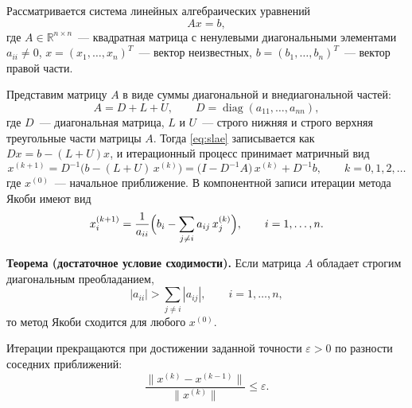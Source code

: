 \documentclass[14pt, a4paper, oneside]{extarticle}
\begin{document}
Рассматривается система линейных алгебраических уравнений
\begin{equation}\label{eq:slae}
A x = b,
\end{equation}
где $A \in \mathbb{R}^{n \times n}$~--- квадратная матрица с ненулевыми
диагональными элементами $a_{ii} \neq 0$,
 $x = (x_1, \dots, x_n)^{T}$~--- вектор неизвестных,
 $b = (b_1, \dots, b_n)^{T}$~--- вектор правой части.

Представим матрицу $A$ в виде суммы диагональной и внедиагональной частей:
\begin{equation}\label{eq:split}
A = D + L + U, \qquad
D = \operatorname{diag}(a_{11}, \dots, a_{nn}),
\end{equation}
где $D$~--- диагональная матрица, $L$ и $U$~--- строго нижняя и строго
верхняя треугольные части матрицы $A$. Тогда \eqref{eq:slae} записывается
как $D x = b - (L + U) x$, и итерационный процесс принимает матричный вид
\begin{equation}\label{eq:jacobi_matrix}
x^{(k+1)} = D^{-1}\bigl(b - (L + U)\, x^{(k)}\bigr)
          = \bigl(I - D^{-1} A\bigr)\, x^{(k)} + D^{-1} b,
\qquad k = 0, 1, 2, \dots
\end{equation}
где $x^{(0)}$~--- начальное приближение. В компонентной записи итерации
метода Якоби имеют вид
\begin{equation}\label{eq:jacobi_comp}
x_i^{(k+1)} = \frac{1}{a_{ii}}
\Bigl( b_i - \sum_{j \ne i} a_{ij}\, x_j^{(k)} \Bigr),
\qquad i = 1, \dots, n.
\end{equation}

\textbf{Теорема (достаточное условие сходимости).} Если матрица $A$ обладает строгим диагональным преобладанием,
\begin{equation}\label{eq:diagdom}
|a_{ii}| > \sum_{j \ne i} |a_{ij}|, \qquad i = 1, \dots, n,
\end{equation}
то метод Якоби сходится для любого $x^{(0)}$. 

Итерации прекращаются при достижении заданной точности $\varepsilon > 0$ по разности
соседних приближений:
\begin{equation}\label{eq:stop}
\frac{\bigl\| x^{(k)} - x^{(k-1)} \bigr\|}{\bigl\| x^{(k)} \bigr\|} \le \varepsilon.
\end{equation}
\end{document}
